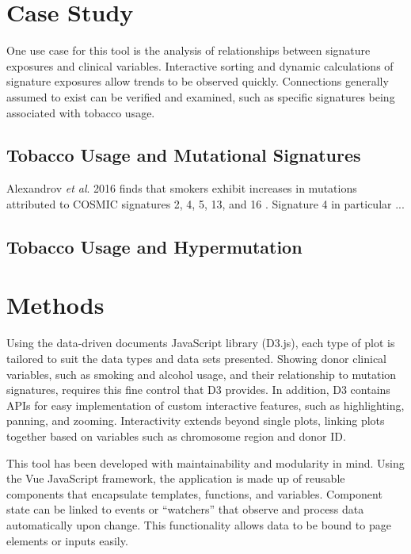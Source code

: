 \documentclass[12pt, letterpaper]{article}
\begin{document}
\section{Case Study}
One use case for this tool is the analysis of relationships between signature exposures and clinical variables.
Interactive sorting and dynamic calculations of signature exposures allow trends to be observed quickly.
Connections generally assumed to exist can be verified and examined, such as specific signatures being associated with tobacco usage.

\subsection{Tobacco Usage and Mutational Signatures}
Alexandrov \textit{et al}. 2016 finds that smokers exhibit increases in mutations attributed to COSMIC signatures 2, 4, 5, 13, and 16 \cite{alexandrov2016mutational}. 
Signature 4 in particular ...

\subsection{Tobacco Usage and Hypermutation}



\section{Methods}
Using the data-driven documents JavaScript library (D3.js)\cite{bostock2011d3}, each type of plot is tailored to suit the data types and data sets presented.
Showing donor clinical variables, such as smoking and alcohol usage, and their relationship to mutation signatures, requires this fine control that D3 provides.
In addition, D3 contains APIs for easy implementation of custom interactive features, such as highlighting, panning, and zooming.
Interactivity extends beyond single plots, linking plots together based on variables such as chromosome region and donor ID.


This tool has been developed with maintainability and modularity in mind.
Using the Vue JavaScript framework, the application is made up of reusable components that encapsulate templates, functions, and variables.
Component state can be linked to events or ``watchers'' that observe and process data automatically upon change.
This functionality allows data to be bound to page elements or inputs easily.
\end{document}
